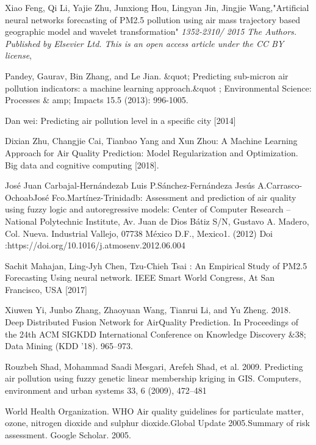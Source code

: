 \begin{thebibliography}{99}

Xiao Feng, Qi Li, Yajie Zhu, Junxiong Hou, Lingyan Jin, Jingjie Wang,"Artificial neural networks forecasting of PM2.5 pollution using air mass
trajectory based geographic model and wavelet transformation" {\em 1352-2310/ 2015 The Authors. Published by Elsevier Ltd. This is an open access article under the CC BY license}, 


Pandey, Gaurav, Bin Zhang, and Le Jian. \&quot; Predicting sub-micron air pollution indicators: a machine learning approach.\&quot ; Environmental Science: Processes \& amp; Impacts 15.5 (2013): 996-1005.

Dan wei: Predicting air pollution level in a specific city
[2014]

Dixian Zhu, Changjie Cai, Tianbao Yang and Xun Zhou: A
Machine Learning Approach for Air Quality Prediction:
Model Regularization and Optimization. Big data and
cognitive computing [2018].

José Juan Carbajal-Hernándezab Luis P.Sánchez-Fernándeza
Jesús A.Carrasco-OchoabJosé Fco.Martínez-Trinidadb:
Assessment and prediction of air quality using fuzzy logic
and autoregressive models: Center of Computer Research –
National Polytechnic Institute, Av. Juan de Dios Bátiz S/N,
Gustavo A. Madero, Col. Nueva. Industrial Vallejo, 07738
México D.F., Mexico1. (2012) Doi
:https://doi.org/10.1016/j.atmosenv.2012.06.004

Sachit Mahajan, Ling-Jyh Chen, Tzu-Chieh Tsai : An
Empirical Study of PM2.5 Forecasting Using neural network.
IEEE Smart World Congress, At San Francisco, USA [2017]

Xiuwen Yi, Junbo Zhang, Zhaoyuan Wang, Tianrui Li, and Yu Zheng. 2018. Deep
Distributed Fusion Network for AirQuality Prediction. In Proceedings of the 24th
ACM SIGKDD International Conference on Knowledge Discovery \&38; Data Mining (KDD ’18). 965–973.

Rouzbeh Shad, Mohammad Saadi Mesgari, Arefeh Shad, et al. 2009. Predicting
air pollution using fuzzy genetic linear membership kriging in GIS. Computers,
environment and urban systems 33, 6 (2009), 472–481

World Health Organization. WHO Air quality guidelines for particulate matter, ozone, nitrogen dioxide and sulphur dioxide.Global Update
2005.Summary of risk assessment. Google Scholar. 2005.


\end{thebibliography}
